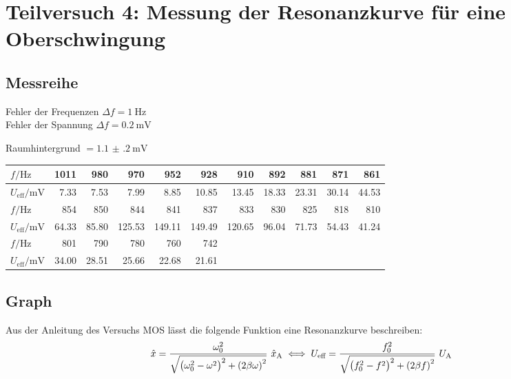 \newpage
\section{Teilversuch 4: Messung der Resonanzkurve für eine Oberschwingung}
	\subsection{Messreihe}
	Fehler der Frequenzen $\Delta f = \SI{1}{\hertz}$ \\
	Fehler der Spannung $\Delta f = \SI{0.2}{\milli\volt}$

	Raumhintergrund $= \SI{1.1(2)}{\milli\volt}$

	\begin{center}
		\begin{tabular}{l *{10}{r}}
			\toprule
			$f / \si{\hertz}$ & \num{1011} & \num{980} & \num{970} & \num{952} & \num{928} & \num{910} & \num{892} & \num{881} & \num{871} & \num{861} \\
			\midrule
			$U_\text{eff} / \si{\milli\volt}$ & \num{7.33} & \num{7.53} & \num{7.99} & \num{8.85} & \num{10.85} & \num{13.45} & \num{18.33} & \num{23.31} & \num{30.14} & \num{44.53} \\
			\bottomrule
			\toprule
			$f / \si{\hertz}$ & \num{854} & \num{850} & \num{844} & \num{841} & \num{837} & \num{833} & \num{830} & \num{825} & \num{818} & \num{810} \\
			\midrule
			$U_\text{eff} / \si{\milli\volt}$ & \num{64.33} & \num{85.80} & \num{125.53} & \num{149.11} & \num{149.49} & \num{120.65} & \num{96.04} & \num{71.73} & \num{54.43} & \num{41.24} \\
			\bottomrule
			\toprule
			$f / \si{\hertz}$ & \num{801} & \num{790} & \num{780} & \num{760} & \num{742}  \\
			\midrule
			$U_\text{eff} / \si{\milli\volt}$ & \num{34.00} & \num{28.51} & \num{25.66} & \num{22.68} & \num{21.61} \\
			\bottomrule
		\end{tabular}
	\end{center}

	\subsection{Graph}
	Aus der Anleitung des Versuchs MOS lässt die folgende Funktion eine Resonanzkurve beschreiben:
	\begin{equation}
		\hat{x} = \frac{\omega_0^2}{\sqrt{\left(\omega_0^2 - \omega^2\right)^2+\left(2\beta\omega\right)^2}}~\hat{x}_\text{A} \iff U_\text{eff} = \frac{f_0^2}{\sqrt{\left(f_0^2 - f^2\right)^2+\left(2\beta f\right)^2}}~U_\text{A}
	\end{equation}

